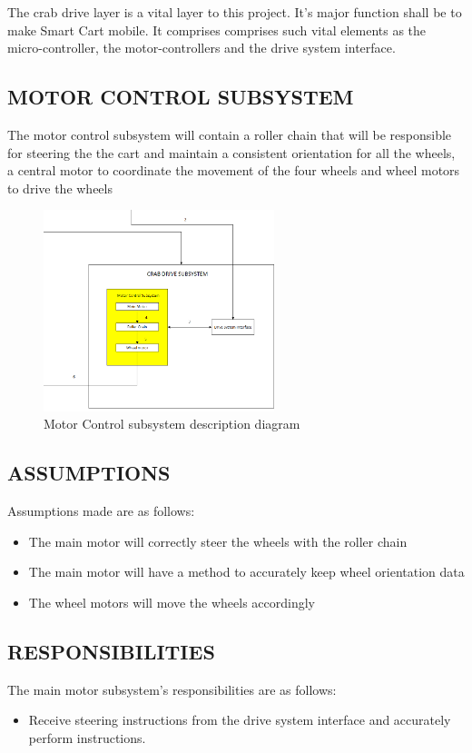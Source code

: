 The crab drive layer is a vital layer to this project. It's major function shall be to make Smart Cart mobile. It comprises comprises such vital elements as the micro-controller, the motor-controllers and the drive system interface.
\subsection{MOTOR CONTROL SUBSYSTEM}
The motor control subsystem will contain a roller chain that will be responsible for steering the the cart and maintain a consistent orientation for all the wheels, a central motor to coordinate the movement of the four wheels and wheel motors to drive the wheels
\begin{figure}[h!]
	\centering
 	\includegraphics[width=0.60\textwidth]{images/motorcontrol}
 \caption{Motor Control subsystem description diagram}
\end{figure}

\subsection{ASSUMPTIONS}
Assumptions made are as follows:
\begin{itemize}
\item The main motor will correctly steer the wheels with the roller chain
\item The main motor will have a method to accurately keep wheel orientation data
\item The wheel motors will move the wheels accordingly
\end{itemize}

\subsection{RESPONSIBILITIES}
The main motor subsystem's responsibilities are as follows:
\begin{itemize}
\item Receive steering instructions from the drive system interface and accurately perform instructions.
\end{itemize}


